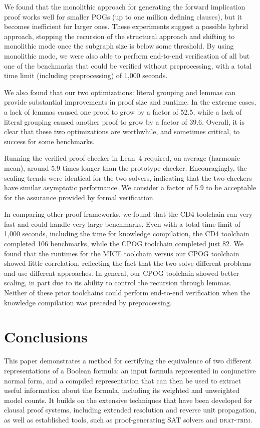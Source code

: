\documentclass[letterpaper,USenglish,cleveref, autoref, thm-restate]{lipics-v2021}
\newcommand{\progname}[1]{\textsc{#1}}
\newcommand{\cdfour}{\progname{CD4}}
\newcommand{\dtrim}{\progname{drat-trim}}
\newcommand{\lean}{Lean~4}
\begin{document}
We found that the monolithic approach for generating the forward
implication proof works well for smaller POGs (up to one million
defining clauses), but it becomes inefficient for larger ones.  These
experiments suggest a possible hybrid approach, stopping the recursion
of the structural approach and shifting to monolithic mode once the
subgraph size is below some threshold.  By using monolithic mode, we
were also able to perform end-to-end verification of all but one of the
benchmarks that could be verified without preprocessing, with a total
time limit (including preprocessing) of 1,000 seconds.

We also found that our two optimizations: literal grouping and
lemmas can provide substantial improvements in proof size and runtime.
In the extreme cases, a lack
of lemmas caused one proof to grow by a factor of 52.5, while a lack
of literal grouping caused another proof to grow by a factor of 39.6.
Overall, it is clear that these two optimizations are worthwhile, and
sometimes critical, to success for some benchmarks.

Running the verified proof checker in \lean{} required, on average
(harmonic mean), around 5.9 times longer than the prototype checker.
Encouragingly, the scaling trends were identical for the two solvers,
indicating that the two checkers have similar asymptotic performance.
We consider a factor of 5.9 to be acceptable for the assurance
provided by formal verification.

In comparing other proof frameworks, we found that the \cdfour{}
toolchain ran very fast and could handle very large benchmarks.  Even
with a total time limit of 1,000 seconds, including the time for
knowledge compilation, the \cdfour{} toolchain completed 106
benchmarks, while the CPOG toolchain completed just 82.  We found
that the runtimes for the MICE toolchain versus our CPOG toolchain
showed little correlation, reflecting the fact that the two solve
different problems and use different approaches.  In general, our CPOG
toolchain showed better scaling, in part due to its ability to control
the recursion through lemmas.  Neither of these prior
toolchains could perform end-to-end verification when the knowledge
compilation was preceded by preprocessing.

\section{Conclusions}
\label{sect:future}

This paper demonstrates a method for certifying the equivalence of two
different representations of a Boolean formula: an input formula
represented in conjunctive normal form, and a compiled representation
that can then be used to extract useful information about the formula,
including its weighted and unweighted model counts.  It builds on the
extensive techniques that have been developed for clausal
proof systems, including extended resolution and reverse unit propagation, as well as established tools, such as
proof-generating SAT solvers and \dtrim{}.
\end{document}
